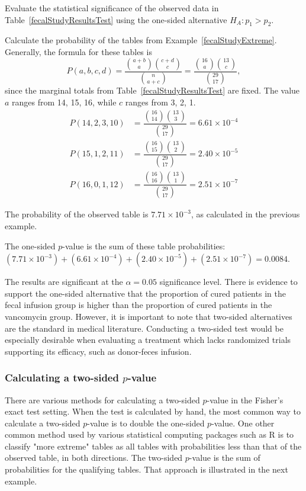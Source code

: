 \begin{example}{Evaluate the statistical significance of the observed data in Table~\ref{fecalStudyResultsTest} using the one-sided alternative $H_A: p_1 > p_2$.}

Calculate the probability of the tables from Example~\ref{fecalStudyExtreme}. Generally, the formula for these tables is 
\[P(a, b, c, d) = \dfrac{ {a+b \choose a} {c+d \choose c}}{{n \choose a+c}} = \dfrac{ {16 \choose a} {13 \choose c}}{{29 \choose 17}},\] 
since the marginal totals from Table~\ref{fecalStudyResultsTest} are fixed. The value $a$ ranges from 14, 15, 16, while $c$ ranges from 3, 2, 1.
\begin{align*}
P(14, 2, 3, 10) &= \dfrac{ {16 \choose 14} {13 \choose 3}}{{29 \choose 17}} = 6.61 \times 10^{-4} \\
P(15, 1, 2, 11) &= \dfrac{ {16 \choose 15} {13 \choose 2}}{{29 \choose 17}} = 2.40 \times 10^{-5} \\
P(16, 0, 1, 12) &= \dfrac{ {16 \choose 16} {13 \choose 1}}{{29 \choose 17}} = 2.51 \times 10^{-7}
\end{align*}

The probability of the observed table is $7.71 \times 10^{-3}$, as calculated in the previous example.

The one-sided $p$-value is the sum of these table probabilities: $(7.71 \times 10^{-3}) + (6.61 \times 10^{-4}) + (2.40 \times 10^{-5}) + (2.51 \times 10^{-7}) = 0.0084.$

The results are significant at the $\alpha = 0.05$ significance level. There is evidence to support the one-sided alternative that the proportion of cured patients in the fecal infusion group is higher than the proportion of cured patients in the vancomycin group. However, it is important to note that two-sided alternatives are the standard in medical literature. Conducting a two-sided test would be especially desirable when evaluating a treatment which lacks randomized trials supporting its efficacy, such as donor-feces infusion.
\end{example}

\subsubsection{Calculating a two-sided $p$-value}

There are various methods for calculating a two-sided $p$-value in the Fisher's exact test setting. When the test is calculated by hand, the most common way to calculate a two-sided $p$-value is to double the one-sided $p$-value. One other common method used by various statistical computing packages such as \textsf{R} is to classify "more extreme" tables as all tables with probabilities less than that of the observed table, in both directions. The two-sided $p$-value is the sum of probabilities for the qualifying tables.  That approach is illustrated in the next example.

